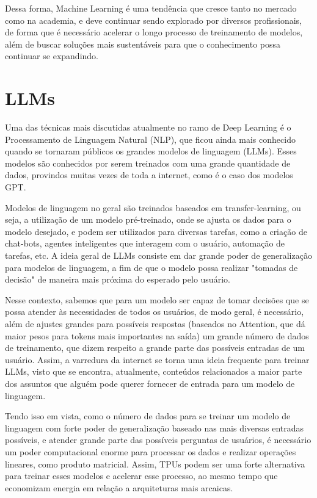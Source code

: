 \documentclass{report}
\begin{document}
Dessa forma, Machine Learning é uma tendência que cresce tanto no mercado como na academia, e deve continuar sendo explorado por diversos profissionais, de forma que é necessário acelerar o longo processo de treinamento de modelos, além de buscar soluções mais sustentáveis para que o conhecimento possa continuar se expandindo.

\section{LLMs}

Uma das técnicas mais discutidas atualmente no ramo de Deep Learning é o Processamento de Linguagem Natural (NLP), que ficou ainda mais conhecido quando se tornaram públicos os grandes modelos de linguagem (LLMs). Esses modelos são conhecidos por serem treinados com uma grande quantidade de dados, provindos muitas vezes de toda a internet, como é o caso dos modelos GPT.

Modelos de linguagem no geral são treinados baseados em transfer-learning, ou seja, a utilização de um modelo pré-treinado, onde se ajusta os dados para o modelo desejado, e podem ser utilizados para diversas tarefas, como a criação de chat-bots, agentes inteligentes que interagem com o usuário, automação de tarefas, etc. A ideia geral de LLMs consiste em dar grande poder de generalização para modelos de linguagem, a fim de que o modelo possa realizar "tomadas de decisão" de maneira mais próxima do esperado pelo usuário.

Nesse contexto, sabemos que para um modelo ser capaz de tomar decisões que se possa atender às necessidades de todos os usuários, de modo geral, é necessário, além de ajustes grandes para possíveis respostas (baseados no Attention, que dá maior pesos para tokens mais importantes na saída) um grande número de dados de treinamento, que dizem respeito a grande parte das possíveis entradas de um usuário. Assim, a varredura da internet se torna uma ideia frequente para treinar LLMs, visto que se encontra, atualmente, conteúdos relacionados a maior parte dos assuntos que alguém pode querer fornecer de entrada para um modelo de linguagem.

Tendo isso em vista, como o número de dados para se treinar um modelo de linguagem com forte poder de generalização baseado nas mais diversas entradas possíveis, e atender grande parte das possíveis perguntas de usuários, é necessário um poder computacional enorme para processar os dados e realizar operações lineares, como produto matricial. Assim, TPUs podem ser uma forte alternativa para treinar esses modelos e acelerar esse processo, ao mesmo tempo que economizam energia em relação a arquiteturas mais arcaicas.
\end{document}
